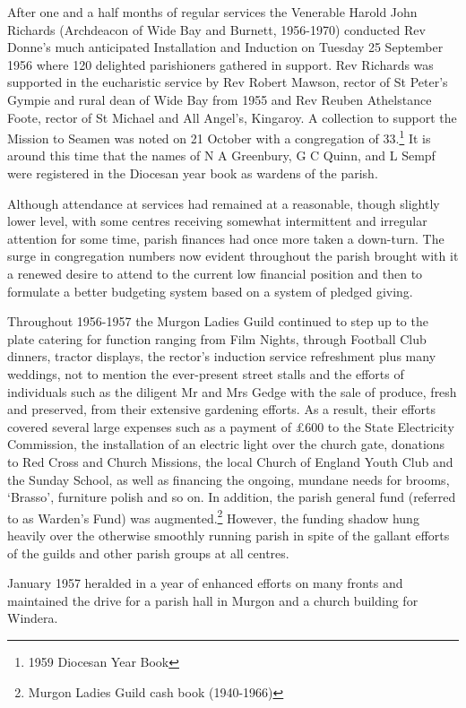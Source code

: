 After one and a half months of regular services the Venerable Harold John Richards (Archdeacon of Wide Bay and Burnett, 1956-1970) conducted Rev Donne's much anticipated Installation and Induction on Tuesday 25 September 1956 where 120 delighted parishioners gathered in support. Rev Richards was supported in the eucharistic service by Rev Robert Mawson, rector of St Peter's Gympie and rural dean of Wide Bay from 1955 and Rev Reuben Athelstance Foote, rector of St Michael and All Angel's, Kingaroy. A collection to support the Mission to Seamen was noted on 21 October with a congregation of 33.\footnote{1959 Diocesan Year Book} It is around this time that the names of N A Greenbury, G C Quinn, and L Sempf were registered in the Diocesan year book as wardens of the parish.


Although attendance at services had remained at a reasonable, though slightly lower level, with some centres receiving somewhat intermittent and irregular attention for some time, parish finances had once more taken a down-turn. The surge in congregation numbers now evident throughout the parish brought with it a renewed desire to attend to the current low financial position and then to formulate a better budgeting system based on a system of pledged giving.



Throughout 1956-1957 the Murgon Ladies Guild continued to step up to the plate catering for function ranging from Film Nights, through Football Club dinners, tractor displays, the rector's induction service refreshment plus many weddings, not to mention the ever-present street stalls and the efforts of individuals such as the diligent Mr and Mrs Gedge with the sale of produce, fresh and preserved, from their extensive gardening efforts. As a result, their efforts covered several large expenses such as a payment of \pounds600 to the State Electricity Commission, the installation of an electric light over the church gate, donations to Red Cross and Church Missions, the local Church of England Youth Club and the Sunday School, as well as financing the ongoing, mundane needs for brooms, `Brasso', furniture polish and so on. In addition, the parish general fund (referred to as Warden's Fund) was augmented.\footnote{Murgon Ladies Guild cash book (1940-1966)} However, the funding shadow hung heavily over the otherwise smoothly running parish in spite of the gallant efforts of the guilds and other parish groups at all centres.


January 1957 heralded in a year of enhanced efforts on many fronts and maintained the drive for a parish hall in Murgon and a church building for Windera.




